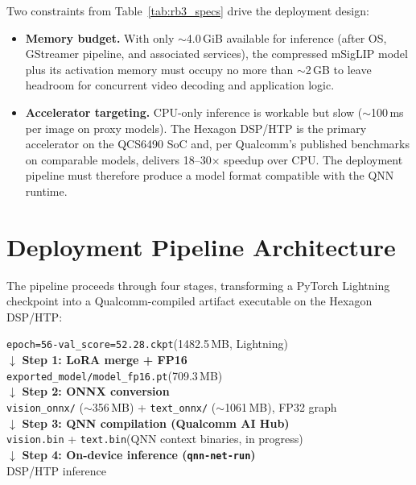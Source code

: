 \documentclass[../main.tex]{subfiles}
\begin{document}
\noindent Two constraints from Table~\ref{tab:rb3_specs} drive the deployment design:

\begin{itemize}
    \item \textbf{Memory budget.} With only $\sim$4.0\,GiB available for inference (after OS, GStreamer pipeline, and associated services), the compressed mSigLIP model plus its activation memory must occupy no more than $\sim$2\,GB to leave headroom for concurrent video decoding and application logic.
    \item \textbf{Accelerator targeting.} CPU-only inference is workable but slow ($\sim$100\,ms per image on proxy models). The Hexagon DSP/HTP is the primary accelerator on the QCS6490 SoC and, per Qualcomm's published benchmarks on comparable models, delivers 18--30$\times$ speedup over CPU. The deployment pipeline must therefore produce a model format compatible with the QNN runtime.
\end{itemize}

\section{Deployment Pipeline Architecture}
\label{sec:pipeline_arch}

\noindent The pipeline proceeds through four stages, transforming a PyTorch Lightning checkpoint into a Qualcomm-compiled artifact executable on the Hexagon DSP/HTP:

\begin{center}
\footnotesize
\texttt{epoch=56-val\_score=52.28.ckpt}\hspace{0.3em}(1482.5\,MB, Lightning)\\
$\downarrow$ \textbf{Step 1: LoRA merge + FP16}\\
\texttt{exported\_model/model\_fp16.pt}\hspace{0.3em}(709.3\,MB)\\
$\downarrow$ \textbf{Step 2: ONNX conversion}\\
\texttt{vision\_onnx/} ($\sim$356\,MB) + \texttt{text\_onnx/} ($\sim$1061\,MB), FP32 graph\\
$\downarrow$ \textbf{Step 3: QNN compilation (Qualcomm AI Hub)}\\
\texttt{vision.bin} + \texttt{text.bin}\hspace{0.3em}(QNN context binaries, in progress)\\
$\downarrow$ \textbf{Step 4: On-device inference (\texttt{qnn-net-run})}\\
DSP/HTP inference
\end{center}
\end{document}

